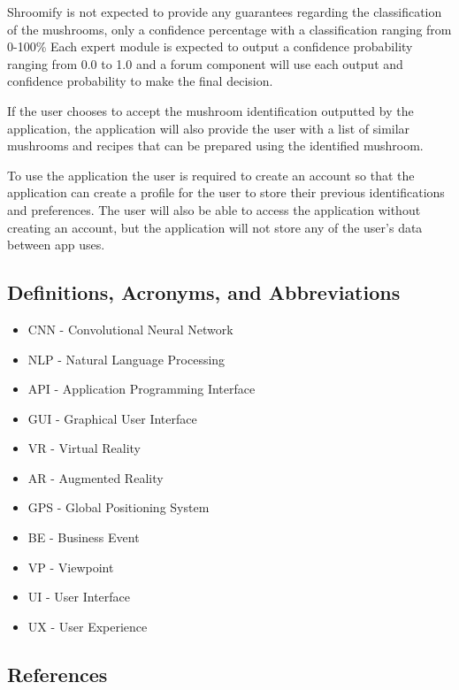 \documentclass[]{article}
\begin{document}
Shroomify is not expected to provide any guarantees regarding the classification of the mushrooms, only a confidence percentage with a classification ranging from 0-100\%
Each expert module is expected to output a confidence probability ranging from 0.0 to 1.0 and a forum component will use each output and confidence probability to make the final decision.

If the user chooses to accept the mushroom identification outputted by the application, the application will also provide the user with a list of similar mushrooms and recipes that can be prepared using the identified mushroom.

To use the application the user is required to create an account so that the application can create a profile for the user to store their previous identifications and preferences. The user will also be able to access the application without creating an account, but the application will not store any of the user's data between app uses.

\subsection{Definitions, Acronyms, and Abbreviations}
\label{sub:definitions_acronyms_and_abbreviations}
\begin{itemize}
	\item CNN - Convolutional Neural Network
	\item NLP - Natural Language Processing
	\item API - Application Programming Interface
	\item GUI - Graphical User Interface
	\item VR - Virtual Reality
	\item AR - Augmented Reality
	\item GPS - Global Positioning System
	\item BE - Business Event
	\item VP - Viewpoint
	\item UI - User Interface
	\item UX - User Experience
\end{itemize}

\subsection{References}
\label{sub:references}
 
\end{document}
